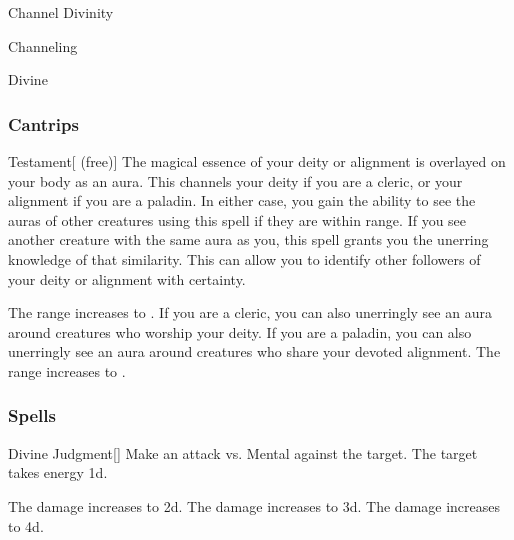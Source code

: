\newpage
\begin{spellsection}{Channel Divinity}

\begin{spellheader}
\end{spellheader}


 Channeling

 Divine

\subsubsection{Cantrips}


\begin{freeability}{Testament}[ (free)]
The magical essence of your deity or alignment is overlayed on your body as an aura.
This channels your deity if you are a cleric, or your alignment if you are a paladin.
In either case, you gain the ability to see the auras of other creatures using this spell if they are within \rngclose range.
If you see another creature with the same aura as you, this spell grants you the unerring knowledge of that similarity.
This can allow you to identify other followers of your deity or alignment with certainty.

\rankline
{} The range increases to \rngmed.
 If you are a cleric, you can also unerringly see an aura around creatures who worship your deity.
If you are a paladin, you can also unerringly see an aura around creatures who share your devoted alignment.
 The range increases to \rngext.
\end{freeability}

\end{spellsection}


\subsubsection{Spells}


\lowercase{\hypertarget{spell:Divine Judgment}{}}\label{spell:Divine Judgment}
\begin{freeability}[Rank 1]{\hypertarget{spell:Divine Judgment}{Divine Judgment}}[]
Make an attack vs. Mental against the target.
\hit The target takes energy  \plus1d.

\rankline
{} The damage increases to  \plus2d.
 The damage increases to  \plus3d.
 The damage increases to  \plus4d.
\end{freeability}
\vspace{0.25em}



